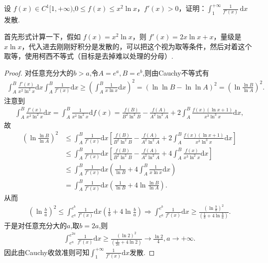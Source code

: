 \documentclass[../../main.tex]{subfiles}%
\begin{document}
\begin{example}
设 $f(x)\in C^{1}[1,+\infty)$,$0\leqslant  f(x)\leqslant  x^{2}\ln x$，$f'(x)>0$，证明：$\int_{1}^{+\infty}\frac{1}{f'(x)}\,\mathrm{d}x$ 发散.
\end{example}
\begin{note}
首先形式计算一下，假如 $f(x)=x^{2}\ln x$，则 $f'(x)=2x\ln x+x$，量级是 $x\ln x$，代入进去刚刚好积分是发散的，可以把这个视为取等条件，然后对着这个取等，使用柯西不等式（目标是去掉难以处理的分母）.
\end{note}
\begin{proof}

对任意充分大的$b>a$,令$A=e^a,B=e^b$,则由Cauchy不等式有
\begin{align*}
\int_A^B{\frac{f' \left( x \right)}{x^2\ln ^2x}\mathrm{d}x}\int_A^B{\frac{1}{f' \left( x \right)}\mathrm{d}x}\geqslant \left( \int_A^B{\frac{1}{x\ln x}\mathrm{d}x} \right) ^2=\left( \ln\ln B-\ln\ln A \right) ^2=\left( \ln \frac{\ln B}{\ln A} \right) ^2.
\end{align*}
注意到
\begin{align*}
\int_A^B{\frac{f' \left( x \right)}{x^2\ln ^2x}\mathrm{d}x}=\int_A^B{\frac{1}{x^2\ln ^2x}\mathrm{d}f\left( x \right)}=\frac{f\left( B \right)}{B^2\ln ^2B}-\frac{f\left( A \right)}{A^2\ln ^2A}+2\int_A^B{\frac{f\left( x \right) \left( \ln x+1 \right)}{x^3\ln ^3x}\mathrm{d}x},
\end{align*}
故
\begin{align*}
\left( \ln \frac{\ln B}{\ln A} \right) ^2&\leqslant \int_A^B{\frac{1}{f' \left( x \right)}\mathrm{d}x}\left[ \frac{f\left( B \right)}{B^2\ln ^2B}-\frac{f\left( A \right)}{A^2\ln ^2A}+2\int_A^B{\frac{f\left( x \right) \left( \ln x+1 \right)}{x^3\ln ^3x}\mathrm{d}x} \right] \\
&\leqslant \int_A^B{\frac{1}{f' \left( x \right)}\mathrm{d}x}\left[ \frac{f\left( B \right)}{B^2\ln ^2B}-\frac{f\left( A \right)}{A^2\ln ^2A}+4\int_A^B{\frac{f\left( x \right)}{x^3\ln ^2x}\mathrm{d}x} \right] \\
&\leqslant \int_A^B{\frac{1}{f' \left( x \right)}\mathrm{d}x}\left( \frac{1}{\ln B}+4\int_A^B{\frac{1}{x\ln x}\mathrm{d}x} \right) \\
&=\int_A^B{\frac{1}{f' \left( x \right)}\mathrm{d}x}\left( \frac{1}{\ln B}+4\ln \frac{\ln B}{\ln A} \right) .
\end{align*}
从而
\begin{align*}
\left( \ln \frac{b}{a} \right) ^2\leqslant \int_{e^a}^{e^b}{\frac{1}{f' \left( x \right)}\mathrm{d}x}\left( \frac{1}{b}+4\ln \frac{b}{a} \right)
\Rightarrow \int_{e^a}^{e^b}{\frac{1}{f' \left( x \right)}\mathrm{d}x}\geqslant \frac{\left( \ln \frac{b}{a} \right) ^2}{\left( \frac{1}{b}+4\ln \frac{b}{a} \right)}.
\end{align*}
于是对任意充分大的$a$,取$b=2a$,则
\begin{align*}
\int_{e^a}^{e^{2a}}{\frac{1}{f' \left( x \right)}\mathrm{d}x}\geqslant \frac{\left( \ln 2 \right) ^2}{\left( \frac{1}{2a}+4\ln 2 \right)}\rightarrow \frac{\ln 2}{4},a\rightarrow +\infty .
\end{align*}
因此由Cauchy收敛准则可知$\int_1^{+\infty}{\frac{1}{f' \left( x \right)}\mathrm{d}x}$发散.

\end{proof}
\end{document}
